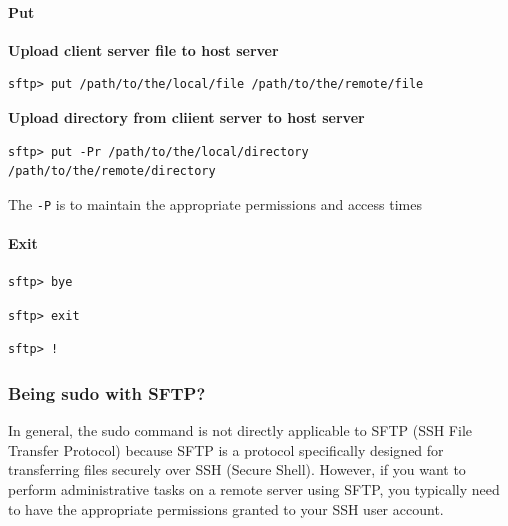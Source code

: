 \documentclass{article}
\newenvironment{blocktemplateI}[1]{%
    \tcolorbox[beamer,%
    noparskip,breakable,
    colframe=Violet,%
    colbacklower=Black,%
    title=#1]}%
    {\endtcolorbox}
\newenvironment{codetemplate}[1][]{%
  \mybasecolorbox[#1]
  \itshape
}{%
  \endmybasecolorbox
}
\begin{document}
\paragraph{Put}

\textbf{Upload client server file to host server}
\begin{codetemplate}{}
\begin{verbatim}
sftp> put /path/to/the/local/file /path/to/the/remote/file
\end{verbatim}
\end{codetemplate}

\textbf{Upload directory from cliient server to host server}
\begin{codetemplate}{}
\begin{verbatim}
sftp> put -Pr /path/to/the/local/directory /path/to/the/remote/directory
\end{verbatim}
\end{codetemplate}

\begin{blocktemplateI}{NOTE}
The \verb|-P| is to maintain the appropriate permissions and access times
\end{blocktemplateI}

\paragraph{Exit}
\begin{codetemplate}{}
\begin{verbatim}
sftp> bye
\end{verbatim}
\end{codetemplate}

\begin{codetemplate}{}
\begin{verbatim}
sftp> exit
\end{verbatim}
\end{codetemplate}

\begin{codetemplate}{}
\begin{verbatim}
sftp> !
\end{verbatim}
\end{codetemplate}

\subsubsection{Being sudo with SFTP?}


In general, the sudo command is not directly applicable to SFTP (SSH File Transfer Protocol) because SFTP is a protocol specifically designed for transferring files securely over SSH (Secure Shell). However, if you want to perform administrative tasks on a remote server using SFTP, you typically need to have the appropriate permissions granted to your SSH user account.
\end{document}
